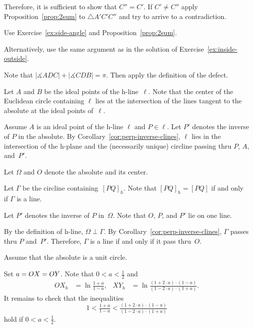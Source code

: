 Therefore, it is sufficient to show that $C''=C'$.
If $C'\ne C''$ apply Proposition~\ref{prop:2sum} to $\triangle A'C'C''$ and try to arrive to a contradiction.


Use Exercise~\ref{ex:side-angle} and Proposition~\ref{prop:2sum}.

Alternatively, use the same argument as in the solution of Exercise~\ref{ex:inside-outside}.

Note that 
$|\measuredangle ADC|+|\measuredangle CDB|=\pi$.
Then apply the definition of the defect.

\setcounter{eqtn}{0}

Let $A$ and $B$ be the ideal points of the h-line~$\ell$. 
Note that the center of the Euclidean circle containing $\ell$ lies 
at the intersection of the lines tangent to the absolute at the ideal points of~$\ell$.

Assume $A$ is an ideal point of the h-line $\ell$
and $P\in \ell$.
Let $P'$ denotes the inverse of $P$ in the absolute.
By Corollary~\ref{cor:perp-inverse-clines},
$\ell$ lies in the intersection of the h-plane and the (necessarily unique) circline 
passing thru $P$, $A$, and~$P'$.

Let $\Omega$ and $O$ denote the absolute and its center. 

Let $\Gamma$ be the circline containing~$[PQ]_h$.
Note that $[PQ]_h=[PQ]$ if and only if $\Gamma$ is a line.

Let $P'$ denotes the inverse of $P$ in~$\Omega$.
Note that $O$, $P$, and $P'$ lie on one line.

By the definition of h-line, $\Omega\perp \Gamma$.
By Corollary~\ref{cor:perp-inverse-clines}, $\Gamma$ passes thru $P$ and~$P'$. 
Therefore, $\Gamma$
is a line if and only if it pass thru~$O$.

Assume that the absolute is a unit circle.

Set $a\z=OX\z=OY$.
Note that $0<a<\tfrac12$ and
\begin{align*}
OX_h&=\ln \tfrac{1+a}{1-a},
&
XY_h&=\ln \tfrac{(1+2\cdot a)\cdot(1-a)}{(1-2\cdot a)\cdot(1+a)}.
\end{align*}
It remains to check that the inequalities 
\[1<
\tfrac{1+a}{1-a}
<
\tfrac{(1+2\cdot a)\cdot(1-a)}{(1-2\cdot a)\cdot(1+a)}\]
hold if $0<a<\tfrac12$.


